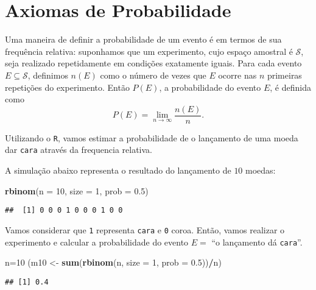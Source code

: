 \documentclass[]{book}
\newenvironment{Shaded}{\begin{snugshade}}{\end{snugshade}}
\newcommand{\DataTypeTok}[1]{\textcolor[rgb]{0.13,0.29,0.53}{#1}}
\newcommand{\DecValTok}[1]{\textcolor[rgb]{0.00,0.00,0.81}{#1}}
\newcommand{\FloatTok}[1]{\textcolor[rgb]{0.00,0.00,0.81}{#1}}
\newcommand{\KeywordTok}[1]{\textcolor[rgb]{0.13,0.29,0.53}{\textbf{#1}}}
\newcommand{\NormalTok}[1]{#1}
\newcommand{\OperatorTok}[1]{\textcolor[rgb]{0.81,0.36,0.00}{\textbf{#1}}}
\newcommand{\StringTok}[1]{\textcolor[rgb]{0.31,0.60,0.02}{#1}}
\theoremstyle{definition}
\theoremstyle{definition}
\theoremstyle{definition}
\theoremstyle{remark}
\begin{document}
\hypertarget{axiomas-de-probabilidade}{%
\section{Axiomas de Probabilidade}\label{axiomas-de-probabilidade}}

Uma maneira de definir a probabilidade de um evento é em termos de sua frequência relativa: suponhamos que um experimento, cujo espaço amostral é \(\mathcal{S}\), seja realizado repetidamente em condições exatamente iguais.
Para cada evento \(E \subseteq \mathcal{S}\), definimos \(n(E)\) como o número de vezes que \(E\) ocorre nas \(n\) primeiras repetições do experimento.
Então \(P(E)\), a probabilidade do evento \(E\), é definida como
\[P(E) = \lim_{n \rightarrow \infty} \frac{n(E)}{n}.\]

Utilizando o \texttt{R}, vamos estimar a probabilidade de o lançamento de uma moeda dar \texttt{cara} através da frequencia relativa.

A simulação abaixo representa o resultado do lançamento de \(10\) moedas:

\begin{Shaded}
\begin{Highlighting}[]
\KeywordTok{rbinom}\NormalTok{(}\DataTypeTok{n =} \DecValTok{10}\NormalTok{, }\DataTypeTok{size =} \DecValTok{1}\NormalTok{, }\DataTypeTok{prob =} \FloatTok{0.5}\NormalTok{)}
\end{Highlighting}
\end{Shaded}

\begin{verbatim}
##  [1] 0 0 0 1 0 0 0 1 0 0
\end{verbatim}

Vamos considerar que \texttt{1} representa \texttt{cara} e \texttt{0} coroa.
Então, vamos realizar o experimento e calcular a probabilidade do evento \(E=\) ``o lançamento dá \texttt{cara}''.

\begin{Shaded}
\begin{Highlighting}[]
\NormalTok{n=}\DecValTok{10}
\NormalTok{(m10 <-}\StringTok{ }\KeywordTok{sum}\NormalTok{(}\KeywordTok{rbinom}\NormalTok{(n, }\DataTypeTok{size =} \DecValTok{1}\NormalTok{, }\DataTypeTok{prob =} \FloatTok{0.5}\NormalTok{))}\OperatorTok{/}\NormalTok{n)}
\end{Highlighting}
\end{Shaded}

\begin{verbatim}
## [1] 0.4
\end{verbatim}
\end{document}
